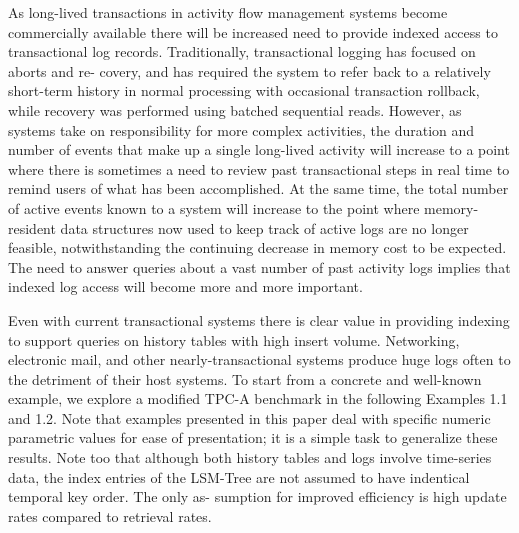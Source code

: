 As long-lived transactions in activity flow management systems become commercially available
 there will be increased need to provide indexed access
to transactional log records. Traditionally, transactional logging has focused on aborts and re-
covery, and has required the system to refer back to a relatively short-term history in normal
processing with occasional transaction rollback, while recovery was performed using batched
sequential reads. However, as systems take on responsibility for more complex activities, the
duration and number of events that make up a single long-lived activity will increase to a point
where there is sometimes a need to review past transactional steps in real time to remind users
of what has been accomplished. At the same time, the total number of active events known to a
system will increase to the point where memory-resident data structures now used to keep
track of active logs are no longer feasible, notwithstanding the continuing decrease in memory
cost to be expected. The need to answer queries about a vast number of past activity logs implies
that indexed log access will become more and more important.

Even with current transactional systems there is clear value in providing indexing to support
queries on history tables with high insert volume. Networking, electronic mail, and other
nearly-transactional systems produce huge logs often to the detriment of their host systems. To
start from a concrete and well-known example, we explore a modified TPC-A benchmark in the
following Examples 1.1 and 1.2. Note that examples presented in this paper deal with specific
numeric parametric values for ease of presentation; it is a simple task to generalize these
results. Note too that although both history tables and logs involve time-series data, the index
entries of the LSM-Tree are not assumed to have indentical temporal key order. The only as-
sumption for improved efficiency is high update rates compared to retrieval rates.

% 	



